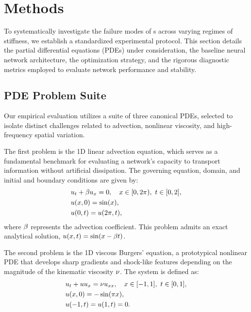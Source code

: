 \section{Methods}\label{sec:methods}

To systematically investigate the failure modes of \PINN{}s across varying regimes of stiffness, we establish a standardized experimental protocol. This section details the partial differential equations (PDEs) under consideration, the baseline neural network architecture, the optimization strategy, and the rigorous diagnostic metrics employed to evaluate network performance and stability.

\subsection{PDE Problem Suite}

Our empirical evaluation utilizes a suite of three canonical PDEs, selected to isolate distinct challenges related to advection, nonlinear viscosity, and high-frequency spatial variation. 

The first problem is the 1D linear advection equation, which serves as a fundamental benchmark for evaluating a network's capacity to transport information without artificial dissipation. The governing equation, domain, and initial and boundary conditions are given by:
\begin{equation}
\begin{aligned}
    & u_t + \beta u_x = 0, \quad x \in [0, 2\pi), \ t \in [0, 2], \\
    & u(x,0) = \sin(x), \\
    & u(0,t) = u(2\pi,t),
\end{aligned}
\end{equation}
where $\beta$ represents the advection coefficient. This problem admits an exact analytical solution, $u(x,t) = \sin(x - \beta t)$.

The second problem is the 1D viscous Burgers' equation, a prototypical nonlinear PDE that develops sharp gradients and shock-like features depending on the magnitude of the kinematic viscosity $\nu$. The system is defined as:
\begin{equation}
\begin{aligned}
    & u_t + u u_x = \nu u_{xx}, \quad x \in [-1, 1], \ t \in [0, 1], \\
    & u(x,0) = -\sin(\pi x), \\
    & u(-1,t) = u(1,t) = 0.
\end{aligned}
\end{equation}

